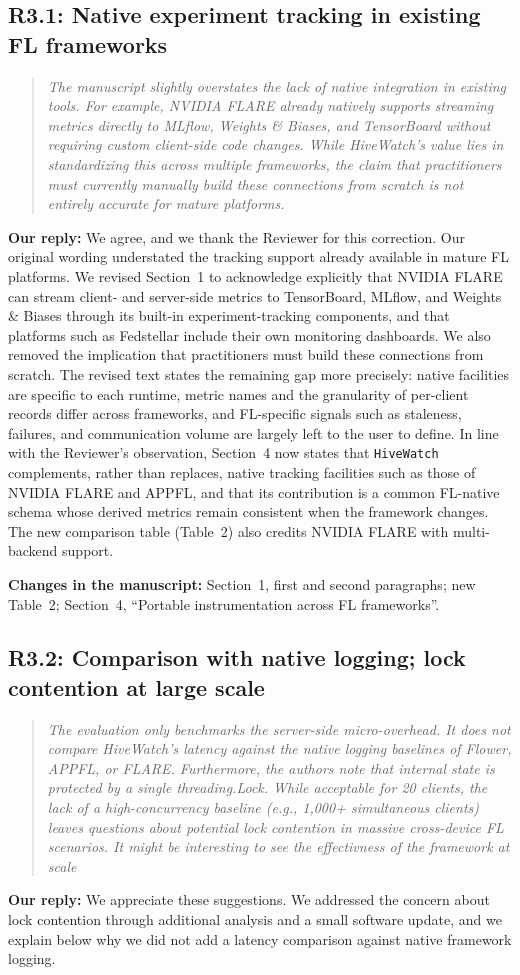 \documentclass[11pt]{article}
\newenvironment{reviewer}{\begin{quote}\itshape\color{blue}}{\end{quote}}
\newcommand{\comment}[2]{\subsection*{R#1: #2}}
\newcommand{\response}{\noindent\textbf{Our reply:} }
\newcommand{\location}[1]{\noindent\textbf{Changes in the manuscript:} #1}
\newcommand{\HW}{\texttt{HiveWatch}}
\begin{document}
\comment{3.1}{Native experiment tracking in existing FL frameworks}
\begin{reviewer}
The manuscript slightly overstates the lack of native integration in existing tools. For example, NVIDIA FLARE already natively supports streaming metrics directly to MLflow, Weights \& Biases, and TensorBoard without requiring custom client-side code changes. While HiveWatch's value lies in standardizing this across multiple frameworks, the claim that practitioners must currently manually build these connections from scratch is not entirely accurate for mature platforms.
\end{reviewer}
\response We agree, and we thank the Reviewer for this correction. Our original wording understated the tracking support already available in mature FL platforms. We revised Section~1 to acknowledge explicitly that NVIDIA FLARE can stream client- and server-side metrics to TensorBoard, MLflow, and Weights \& Biases through its built-in experiment-tracking components, and that platforms such as Fedstellar include their own monitoring dashboards. We also removed the implication that practitioners must build these connections from scratch. The revised text states the remaining gap more precisely: native facilities are specific to each runtime, metric names and the granularity of per-client records differ across frameworks, and FL-specific signals such as staleness, failures, and communication volume are largely left to the user to define. In line with the Reviewer's observation, Section~4 now states that \HW{} complements, rather than replaces, native tracking facilities such as those of NVIDIA FLARE and APPFL, and that its contribution is a common FL-native schema whose derived metrics remain consistent when the framework changes. The new comparison table (Table~2) also credits NVIDIA FLARE with multi-backend support.

\location{Section~1, first and second paragraphs; new Table~2; Section~4, ``Portable instrumentation across FL frameworks''.}

\comment{3.2}{Comparison with native logging; lock contention at large scale}
\begin{reviewer}
The evaluation only benchmarks the server-side micro-overhead. It does not compare HiveWatch's latency against the native logging baselines of Flower, APPFL, or FLARE. Furthermore, the authors note that internal state is protected by a single threading.Lock. While acceptable for 20 clients, the lack of a high-concurrency baseline (e.g., 1,000+ simultaneous clients) leaves questions about potential lock contention in massive cross-device FL scenarios. It might be interesting to see the effectivness of the framework at scale
\end{reviewer}
\response We appreciate these suggestions. We addressed the concern about lock contention through additional analysis and a small software update, and we explain below why we did not add a latency comparison against native framework logging.
\end{document}
